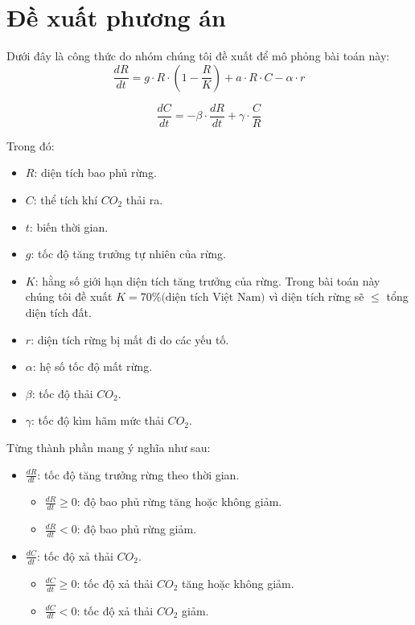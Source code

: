 \documentclass[a4paper,12pt]{report}
\begin{document}
\section{Đề xuất phương án} %
\label{sec:đề_xuất_phương_án}
\begin{flushleft}
	Dưới đây là công thức do nhóm chúng tôi đề xuất để mô phỏng bài toán này:
	$$
		\frac{dR}{dt} = g \cdot R \cdot \left(1 - \frac{R}{K} \right) + a \cdot R \cdot C - \alpha \cdot r
	$$

	$$
		\frac{dC}{dt} = - \beta \cdot \frac{dR}{dt} + \gamma \cdot \frac{C}{R}
	$$

	Trong đó:
	\begin{itemize}
		\item $R$: diện tích bao phủ rừng.

		\item $C$: thể tích khí $CO_{2}$ thải ra.

		\item $t$: biến thời gian.

		\item $g$: tốc độ tăng trưởng tự nhiên của rừng.

		\item $K$: hằng số giới hạn diện tích tăng trưởng của rừng. Trong bài toán này chúng tôi đề xuất $K = 70\% \text{(diện tích Việt Nam)}$ vì diện tích rừng sẽ $\leq$ tổng diện tích đất.

		\item $r$: diện tích rừng bị mất đi do các yếu tố.

		\item $\alpha$: hệ số tốc độ mất rừng.

		\item $\beta$: tốc độ thải $CO_{2}$.

		\item $\gamma$: tốc độ kìm hãm mức thải $CO_{2}$.
	\end{itemize}

	Từng thành phần mang ý nghĩa như sau:
	\begin{itemize}
		\item $\frac{dR}{dt}$: tốc độ tăng trưởng rừng theo thời gian.
		\begin{itemize}
			\item $\frac{dR}{dt} \geq 0$: độ bao phủ rừng tăng hoặc không giảm.
			\item $\frac{dR}{dt} < 0$: độ bao phủ rừng giảm.
		\end{itemize}

		\item $\frac{dC}{dt}$: tốc độ xả thải $CO_{2}$.
		\begin{itemize}
			\item $\frac{dC}{dt} \geq 0$: tốc độ xả thải $CO_{2}$ tăng hoặc không giảm.
			\item $\frac{dC}{dt} < 0$: tốc độ xả thải $CO_{2}$ giảm.
		\end{itemize}


\end{itemize}
\end{flushleft}
\end{document}
